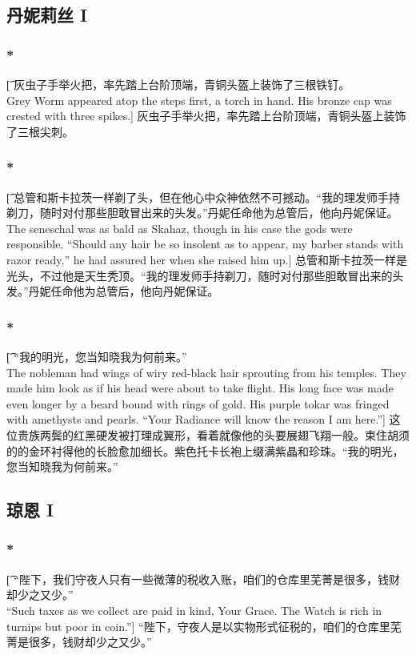 \documentclass[12pt,a4paper]{article}
\begin{document}
\subsection{丹妮莉丝 I}
\subsubsection{\color{red}*}\t[
	灰虫子手举火把，率先踏上台阶顶端，青铜头盔上装饰了三根铁钉。\\
	Grey Worm appeared atop the steps first, a torch in hand. His bronze cap was crested with three spikes.]
	灰虫子手举火把，率先踏上台阶顶端，青铜头盔上装饰了三根尖刺。
	
\subsubsection{\color{red}*}\t[
	总管和斯卡拉茨一样剃了头，但在他心中众神依然不可撼动。“我的理发师手持剃刀，随时对付那些胆敢冒出来的头发。”丹妮任命他为总管后，他向丹妮保证。\\
	The seneschal was as bald as Skahaz, though in his case the gods were responsible. “Should any hair be so insolent as to appear, my barber stands with razor ready,” he had assured her when she raised him up.]
	总管和斯卡拉茨一样是光头，不过他是天生秃顶。“我的理发师手持剃刀，随时对付那些胆敢冒出来的头发。”丹妮任命他为总管后，他向丹妮保证。
	
\subsubsection{\color{red}*}\t[
	“我的明光，您当知晓我为何前来。”\\
	The nobleman had wings of wiry red-black hair sprouting from his temples. They made him look as if his head were about to take flight. His long face was made even longer by a beard bound with rings of gold. His purple tokar was fringed with amethysts and pearls. “Your Radiance will know the reason I am here.”]
	这位贵族两鬓的红黑硬发被打理成翼形，看着就像他的头要展翅飞翔一般。束住胡须的的金环衬得他的长脸愈加细长。紫色托卡长袍上缀满紫晶和珍珠。“我的明光，您当知晓我为何前来。”
	
\subsection{琼恩 I}
\subsubsection{\color{red}*}\t[
	“陛下，我们守夜人只有一些微薄的税收入账，咱们的仓库里芜菁是很多，钱财却少之又少。”\\
	“Such taxes as we collect are paid in kind, Your Grace. The Watch is rich in turnips but poor in coin.”]
	“陛下，守夜人是以实物形式征税的，咱们的仓库里芜菁是很多，钱财却少之又少。”
	
\end{document}
